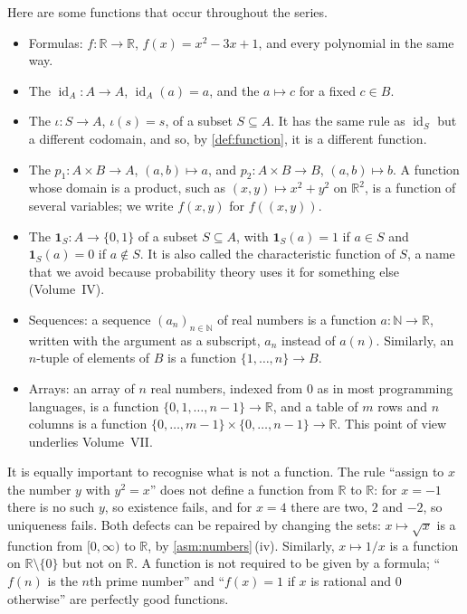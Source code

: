 Here are some functions that occur throughout the series.
\begin{itemize}
\item Formulas: $f\colon\mathbb R\to\mathbb R$, $f(x)=x^2-3x+1$, and every polynomial in the same way.
\item The  $\operatorname{id}_A\colon A\to A$, $\operatorname{id}_A(a)=a$, and the  $a\mapsto c$ for a fixed $c\in B$.
\item The  $\iota\colon S\to A$, $\iota(s)=s$, of a subset $S\subseteq A$. It has the same rule as $\operatorname{id}_S$ but a different codomain, and so, by \cref{def:function}, it is a different function.
\item The  $p_1\colon A\times B\to A$, $(a,b)\mapsto a$, and $p_2\colon A\times B\to B$, $(a,b)\mapsto b$. A function whose domain is a product, such as $(x,y)\mapsto x^2+y^2$ on $\mathbb R^2$, is a function of several variables; we write $f(x,y)$ for $f((x,y))$.
\item The  $\mathbf 1_S\colon A\to\{0,1\}$ of a subset $S\subseteq A$, with $\mathbf 1_S(a)=1$ if $a\in S$ and $\mathbf 1_S(a)=0$ if $a\notin S$. It is also called the characteristic function of $S$, a name that we avoid because probability theory uses it for something else (Volume~IV).
\item Sequences: a sequence $(a_n)_{n\in\mathbb N}$ of real numbers is a function $a\colon\mathbb N\to\mathbb R$, written with the argument as a subscript, $a_n$ instead of $a(n)$. Similarly, an $n$-tuple of elements of $B$ is a function $\{1,\ldots,n\}\to B$.
\item Arrays: an array of $n$ real numbers, indexed from $0$ as in most programming languages, is a function $\{0,1,\ldots,n-1\}\to\mathbb R$, and a table of $m$ rows and $n$ columns is a function $\{0,\ldots,m-1\}\times\{0,\ldots,n-1\}\to\mathbb R$. This point of view underlies Volume~VII.
\end{itemize}

It is equally important to recognise what is not a function. The rule ``assign to $x$ the number $y$ with $y^2=x$'' does not define a function from $\mathbb R$ to $\mathbb R$: for $x=-1$ there is no such $y$, so existence fails, and for $x=4$ there are two, $2$ and $-2$, so uniqueness fails. Both defects can be repaired by changing the sets: $x\mapsto\sqrt x$ is a function from $[0,\infty)$ to $\mathbb R$, by \cref{asm:numbers}\,(iv). Similarly, $x\mapsto1/x$ is a function on $\mathbb R\setminus\{0\}$ but not on $\mathbb R$. A function is not required to be given by a formula; ``$f(n)$ is the $n$th prime number'' and ``$f(x)=1$ if $x$ is rational and $0$ otherwise'' are perfectly good functions.

